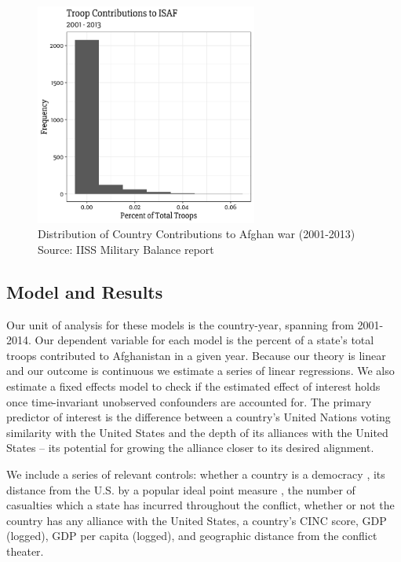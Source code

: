 \documentclass[12pt,letterpaper]{article}
\begin{document}
		\begin{figure}[ht]
			\centering
			\includegraphics[width=0.65\textwidth]{figures/troop_dist.pdf}
			\caption{Distribution of Country Contributions to Afghan war (2001-2013) Source: IISS Military Balance report}
			\label{fig:troop_hist}
		\end{figure}
		
	\subsection{Model and Results}
		Our unit of analysis for these models is the country-year, spanning from 2001-2014. Our dependent variable for each model is the percent of a state's total troops contributed to Afghanistan in a given year. Because our theory is linear and our outcome is continuous we estimate a series of linear regressions. We also estimate a fixed effects model to check if the estimated effect of interest holds once time-invariant unobserved confounders are accounted for. The primary predictor of interest is the difference between a country's United Nations voting similarity with the United States and the depth of its alliances with the United States -- its potential for growing the alliance closer to its desired alignment.
		
		We include a series of relevant controls: whether a country is a democracy \citep{gartzke_whydemocraciesmay_2004}, its distance from the U.S. by a popular ideal point measure \citep{bailey_estimatingdynamicstate_2017}, the number of casualties which a state has incurred throughout the conflict, whether or not the country has any alliance with the United States, a country's CINC score, GDP (logged), GDP per capita (logged), and geographic distance from the conflict theater.
		
\end{document}
